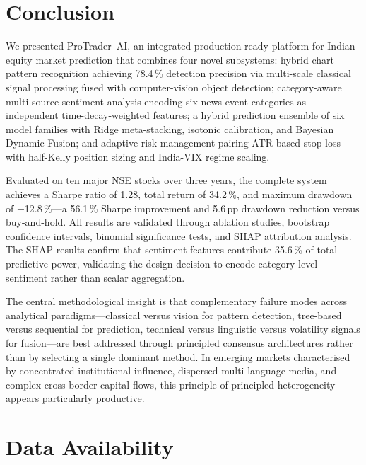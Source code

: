 \documentclass[ASNA,twocolumn]{USG}
\begin{document}
\section{Conclusion}\label{sec:conclusion}

We presented ProTrader~AI, an integrated production-ready platform for Indian
equity market prediction that combines four novel subsystems: hybrid chart
pattern recognition achieving 78.4\,\% detection precision via multi-scale
classical signal processing fused with computer-vision object detection;
category-aware multi-source sentiment analysis encoding six news event
categories as independent time-decay-weighted features; a hybrid prediction
ensemble of six model families with Ridge meta-stacking, isotonic calibration,
and Bayesian Dynamic Fusion; and adaptive risk management pairing ATR-based
stop-loss with half-Kelly position sizing and India-VIX regime scaling.

Evaluated on ten major NSE stocks over three years, the complete system
achieves a Sharpe ratio of 1.28, total return of 34.2\,\%, and maximum
drawdown of $-$12.8\,\%---a 56.1\,\% Sharpe improvement and 5.6\,pp
drawdown reduction versus buy-and-hold. All results are validated through
ablation studies, bootstrap confidence intervals, binomial significance
tests, and SHAP attribution analysis. The SHAP results confirm that
sentiment features contribute 35.6\,\% of total predictive power,
validating the design decision to encode category-level sentiment rather
than scalar aggregation.

The central methodological insight is that complementary failure modes
across analytical paradigms---classical versus vision for pattern detection,
tree-based versus sequential for prediction, technical versus linguistic
versus volatility signals for fusion---are best addressed through principled
consensus architectures rather than by selecting a single dominant method.
In emerging markets characterised by concentrated institutional influence,
dispersed multi-language media, and complex cross-border capital flows,
this principle of principled heterogeneity appears particularly productive.

\section*{Data Availability}
\end{document}
